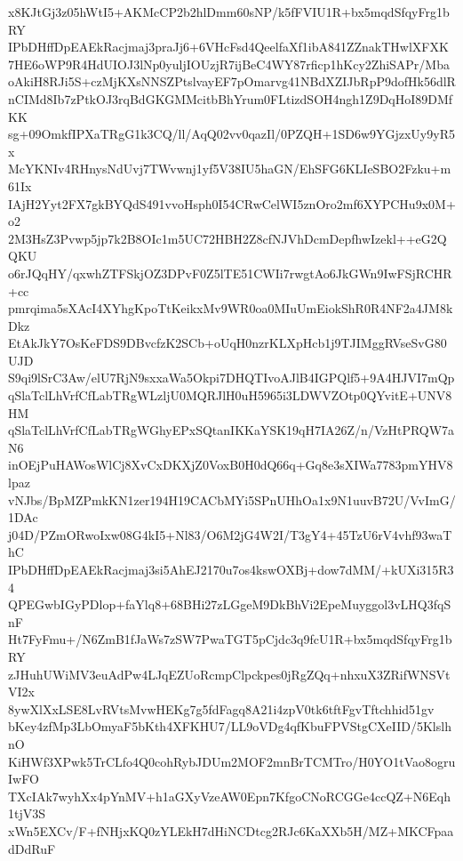 x8KJtGj3z05hWtI5+AKMcCP2b2hlDmm60sNP/k5fFVIU1R+bx5mqdSfqyFrg1bRY
IPbDHffDpEAEkRacjmaj3praJj6+6VHcFsd4QeelfaXf1ibA841ZZnakTHwlXFXK
7HE6oWP9R4HdUIOJ3lNp0yuljIOUzjR7ijBeC4WY87rficp1hKcy2ZhiSAPr/Mba
oAkiH8RJi5S+czMjKXsNNSZPtslvayEF7pOmarvg41NBdXZIJbRpP9dofHk56dlR
nCIMd8Ib7zPtkOJ3rqBdGKGMMcitbBhYrum0FLtizdSOH4ngh1Z9DqHoI89DMfKK
sg+09OmkfIPXaTRgG1k3CQ/ll/AqQ02vv0qazIl/0PZQH+1SD6w9YGjzxUy9yR5x
McYKNIv4RHnysNdUvj7TWvwnj1yf5V38IU5haGN/EhSFG6KLIeSBO2Fzku+m61Ix
IAjH2Yyt2FX7gkBYQdS491vvoHsph0I54CRwCelWI5znOro2mf6XYPCHu9x0M+o2
2M3HsZ3Pvwp5jp7k2B8OIc1m5UC72HBH2Z8cfNJVhDcmDepfhwIzekl++eG2QQKU
o6rJQqHY/qxwhZTFSkjOZ3DPvF0Z5lTE51CWIi7rwgtAo6JkGWn9IwFSjRCHR+cc
pmrqima5sXAcI4XYhgKpoTtKeikxMv9WR0oa0MIuUmEiokShR0R4NF2a4JM8kDkz
EtAkJkY7OsKeFDS9DBvcfzK2SCb+oUqH0nzrKLXpHcb1j9TJIMggRVseSvG80UJD
S9qi9lSrC3Aw/elU7RjN9sxxaWa5Okpi7DHQTIvoAJlB4IGPQlf5+9A4HJVI7mQp
qSlaTclLhVrfCfLabTRgWLzljU0MQRJlH0uH5965i3LDWVZOtp0QYvitE+UNV8HM
qSlaTclLhVrfCfLabTRgWGhyEPxSQtanIKKaYSK19qH7IA26Z/n/VzHtPRQW7aN6
inOEjPuHAWosWlCj8XvCxDKXjZ0VoxB0H0dQ66q+Gq8e3sXIWa7783pmYHV8lpaz
vNJbs/BpMZPmkKN1zer194H19CACbMYi5SPnUHhOa1x9N1uuvB72U/VvImG/1DAc
j04D/PZmORwoIxw08G4kI5+Nl83/O6M2jG4W2I/T3gY4+45TzU6rV4vhf93waThC
IPbDHffDpEAEkRacjmaj3si5AhEJ2170u7os4kswOXBj+dow7dMM/+kUXi315R34
QPEGwbIGyPDlop+faYlq8+68BHi27zLGgeM9DkBhVi2EpeMuyggol3vLHQ3fqSnF
Ht7FyFmu+/N6ZmB1fJaWs7zSW7PwaTGT5pCjdc3q9fcU1R+bx5mqdSfqyFrg1bRY
zJHuhUWiMV3euAdPw4LJqEZUoRcmpClpckpes0jRgZQq+nhxuX3ZRifWNSVtVI2x
8ywXlXxLSE8LvRVtsMvwHEKg7g5fdFagq8A21i4zpV0tk6tftFgvTftchhid51gv
bKey4zfMp3LbOmyaF5bKth4XFKHU7/LL9oVDg4qfKbuFPVStgCXeIID/5KlslhnO
KiHWf3XPwk5TrCLfo4Q0cohRybJDUm2MOF2mnBrTCMTro/H0YO1tVao8ogruIwFO
TXcIAk7wyhXx4pYnMV+h1aGXyVzeAW0Epn7KfgoCNoRCGGe4ccQZ+N6Eqh1tjV3S
xWn5EXCv/F+fNHjxKQ0zYLEkH7dHiNCDtcg2RJc6KaXXb5H/MZ+MKCFpaadDdRuF
